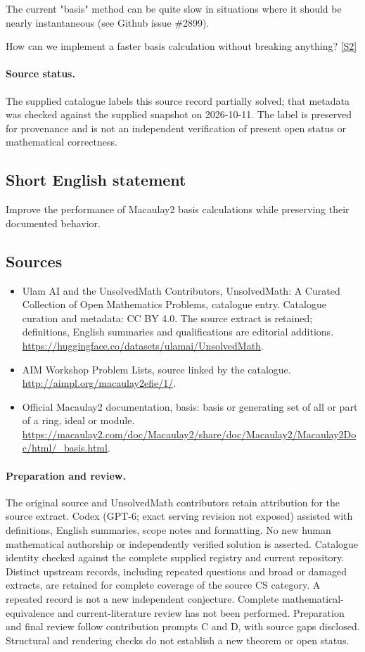 \documentclass[11pt]{article}
\newcommand{\sref}[2]{\hyperlink{source:#1:#2}{[S#2]}}
\begin{document}
The current "basis" method can be quite slow in situations where it should be nearly instantaneous (see Github issue \#2899).

How can we implement a faster basis calculation without breaking anything? \sref{statement}{2}
\paragraph{Source status.}
The supplied catalogue labels this source record partially solved; that metadata was checked against the supplied snapshot on 2026-10-11. The label is preserved for provenance and is not an independent verification of present open status or mathematical correctness.
\subsection{Short English statement}
Improve the performance of Macaulay2 basis calculations while preserving their documented behavior.
\subsection{Sources}
\begin{itemize}
\item[\hypertarget{source:statement:1}{S1}] Ulam AI and the UnsolvedMath Contributors, UnsolvedMath: A Curated Collection of Open Mathematics Problems, catalogue entry. Catalogue curation and metadata: CC BY 4.0. The source extract is retained; definitions, English summaries and qualifications are editorial additions.
\url{https://huggingface.co/datasets/ulamai/UnsolvedMath}.
\item[\hypertarget{source:statement:2}{S2}] AIM Workshop Problem Lists, source linked by the catalogue.
\url{http://aimpl.org/macaulay2efie/1/}.
\item[\hypertarget{source:statement:3}{S3}] Official Macaulay2 documentation, basis: basis or generating set of all or part of a ring, ideal or module.
\url{https://macaulay2.com/doc/Macaulay2/share/doc/Macaulay2/Macaulay2Doc/html/_basis.html}.
\end{itemize}
\paragraph{Preparation and review.}
The original source and UnsolvedMath contributors retain attribution for the source extract. Codex (GPT-6; exact serving revision not exposed) assisted with definitions, English summaries, scope notes and formatting. No new human mathematical authorship or independently verified solution is asserted. Catalogue identity checked against the complete supplied registry and current repository. Distinct upstream records, including repeated questions and broad or damaged extracts, are retained for complete coverage of the source CS category. A repeated record is not a new independent conjecture. Complete mathematical-equivalence and current-literature review has not been performed. Preparation and final review follow contribution prompts C and D, with source gaps disclosed. Structural and rendering checks do not establish a new theorem or open status.
\label{end:statement}
\end{document}
